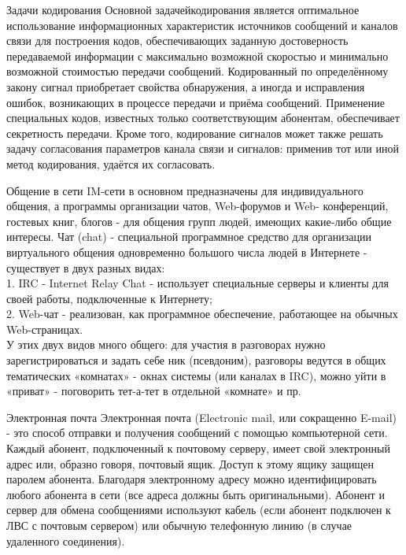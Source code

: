 \documentclass{beamer}
\begin{document}
\begin{frame}{Задачи кодирования}
Основной задачейкодирования является оптимальное использование информационных характеристик источников сообщений и каналов связи для построения кодов, обеспечивающих заданную достоверность передаваемой информации с максимально возможной скоростью и минимально возможной стоимостью передачи сообщений.
Кодированный по определённому закону сигнал приобретает свойства обнаружения, а иногда и исправления ошибок, возникающих в процессе передачи и приёма сообщений.
Применение специальных кодов, известных только соответствующим абонентам, обеспечивает секретность передачи. Кроме того, кодирование сигналов может также решать задачу согласования параметров канала связи и сигналов: применив тот или иной метод кодирования, удаётся их согласовать. 
\end{frame}


\begin{frame}{Общение в сети}
IM-сети в основном предназначены для индивидуального общения, а программы организации чатов, Web-форумов и Web- конференций, гостевых книг, блогов - для общения групп людей, имеющих какие-либо общие интересы.
Чат (chat) - специальной программное средство для организации виртуального общения одновременно большого числа людей в Интернете - существует в двух разных видах:\\
1. IRC - Internet Relay Chat - использует специальные серверы и клиенты для своей работы, подключенные к Интернету;\\
2. Web-чат - реализован, как программное обеспечение, работающее на обычных Web-страницах.\\
У этих двух видов много общего: для участия в разговорах нужно зарегистрироваться и задать себе ник (псевдоним), разговоры ведутся в общих тематических «комнатах» - окнах системы (или каналах в IRC), можно уйти в «приват» - поговорить тет-а-тет в отдельной «комнате» и пр.
\end{frame}

\begin{frame}{Электронная почта}
Электронная почта (Electronic mail, или сокращенно E-mail) - это способ отправки и получения сообщений с помощью компьютерной сети. Каждый абонент, подключенный к почтовому серверу, имеет свой электронный адрес или, образно говоря, почтовый ящик. Доступ к этому ящику защищен паролем абонента. Благодаря электронному адресу можно идентифицировать любого абонента в сети (все адреса должны быть оригинальными). Абонент и сервер для обмена сообщениями используют кабель (если абонент подключен к ЛВС с почтовым сервером) или обычную телефонную линию (в случае удаленного соединения).
\end{frame}
\end{document}

